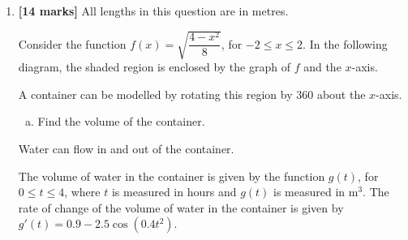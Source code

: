 \documentclass[12pt, twoside]{article}
\begin{document}
\begin{enumerate}
In the study, 38\% of the participants are in Group X.

\begin{enumerate}[(a)]
    \setcounter{enumii}{2}
    \item A randomly selected participant has a reaction time greater than 0.65 seconds. Find the probability that the participant is in Group X.
    \item Ten of the participants with reaction times greater than 0.65 are selected at random. Find the probability that at least two of them are in Group X.
\end{enumerate}

\vspace{1cm}

\item \textbf{[14 marks]} All lengths in this question are in metres.

Consider the function $f(x) = \sqrt{\dfrac{4-x^2}{8}}$, for $-2 \leq x \leq 2$. In the following diagram, the shaded region is enclosed by the graph of $f$ and the $x$-axis.

\begin{center}
\end{center}

A container can be modelled by rotating this region by $360$ about the $x$-axis.

\begin{enumerate}[(a)]
    \item Find the volume of the container.
\end{enumerate}

Water can flow in and out of the container.

The volume of water in the container is given by the function $g(t)$, for $0 \leq t \leq 4$, where $t$ is measured in hours and $g(t)$ is measured in m$^3$. The rate of change of the volume of water in the container is given by $g'(t) = 0.9 - 2.5\cos(0.4t^2)$.


\end{enumerate}
\end{document}
